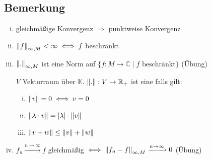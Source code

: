 \subsection[Bemerkung zur Normen]{Bemerkung} %
\label{sub:12}
\begin{enumerate}[(i)]
	\item gleichmäßige Konvergenz $\Longrightarrow $ punktweise Konvergenz
	\item $\norm[\infty, M]{f} < \infty \iff f$ beschränkt
	\item \label{12:enum:3}$\norm[\infty, M]{.}$ ist eine Norm auf $\{ f: M \to \mathds{C} \mid f \text{ beschränkt}\}$ \hfill (Übung)
	
	$V$ Vektorraum über $\mathds{K}$. $\norm{.} : V \to \mathds{R}_+$ ist eine   falls gilt: 
	\begin{enumerate}[(i)]
		\item $\norm{v}=0 \iff v = 0$
		\item $\norm{\lambda \cdot v} = \abs{\lambda } \cdot \norm{v}$
		\item $\norm{v+w} \le \norm{v} + \norm{w}$
	\end{enumerate}
	\item $f_n \xrightarrow{n \to \infty} f$ gleichmäßig $\iff \norm[\infty,M]{f_n -f} \xrightarrow{n \to \infty} 0$  \hfill (Übung)
\end{enumerate}

